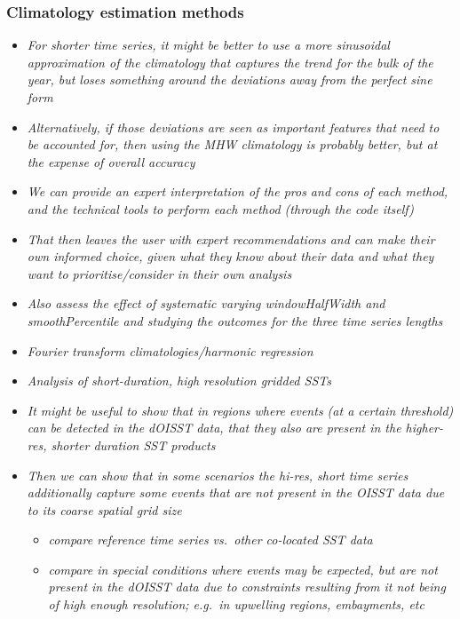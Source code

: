 \documentclass[]{article}
\providecommand{\tightlist}{%
  \setlength{\itemsep}{0pt}\setlength{\parskip}{0pt}}
\begin{document}
\subsubsection{Climatology estimation
methods}\label{climatology-estimation-methods}

\begin{itemize}
\tightlist
\item
  \emph{For shorter time series, it might be better to use a more
  sinusoidal approximation of the climatology that captures the trend
  for the bulk of the year, but loses something around the deviations
  away from the perfect sine form}
\item
  \emph{Alternatively, if those deviations are seen as important
  features that need to be accounted for, then using the MHW climatology
  is probably better, but at the expense of overall accuracy}
\item
  \emph{We can provide an expert interpretation of the pros and cons of
  each method, and the technical tools to perform each method (through
  the code itself)}
\item
  \emph{That then leaves the user with expert recommendations and can
  make their own informed choice, given what they know about their data
  and what they want to prioritise/consider in their own analysis}
\item
  \emph{Also assess the effect of systematic varying windowHalfWidth and
  smoothPercentile and studying the outcomes for the three time series
  lengths}
\item
  \emph{Fourier transform climatologies/harmonic regression}
\item
  \emph{Analysis of short-duration, high resolution gridded SSTs}
\item
  \emph{It might be useful to show that in regions where events (at a
  certain threshold) can be detected in the dOISST data, that they also
  are present in the higher-res, shorter duration SST products}
\item
  \emph{Then we can show that in some scenarios the hi-res, short time
  series additionally capture some events that are not present in the
  OISST data due to its coarse spatial grid size}

  \begin{itemize}
  \tightlist
  \item
    \emph{compare reference time series vs.~other co-located SST data}
  \item
    \emph{compare in special conditions where events may be expected,
    but are not present in the dOISST data due to constraints resulting
    from it not being of high enough resolution; e.g.~in upwelling
    regions, embayments, etc}
  \end{itemize}
\end{itemize}
\end{document}
